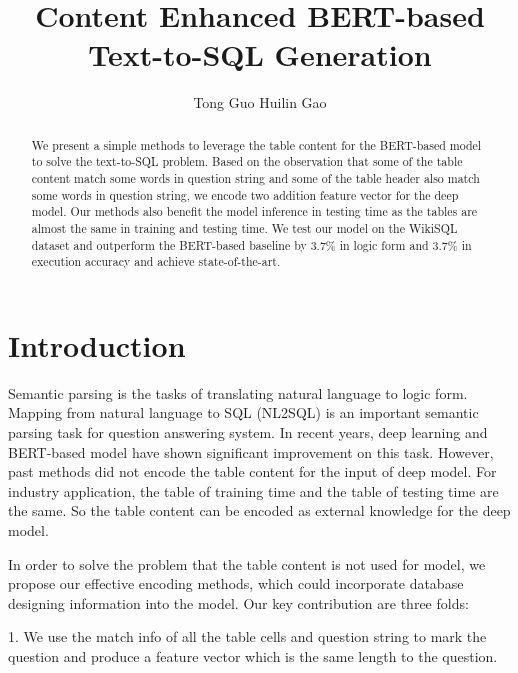 \documentclass{llncs}
\begin{document}
\title{Content Enhanced BERT-based \newline Text-to-SQL Generation}
\author{
Tong Guo
Huilin Gao
}


\maketitle              \begin{abstract}
We present a simple methods to leverage the table content for the BERT-based model to solve the text-to-SQL problem. Based on the observation that some of the table content match some words in question string and some of the table header also match some words in question string, we encode two addition feature vector for the deep model. Our methods also benefit the model inference in testing time as the tables are almost the same in training and testing time. We test our model on the WikiSQL dataset and outperform the BERT-based baseline by 3.7\% in logic form and 3.7\% in execution accuracy and  achieve state-of-the-art.

\end{abstract}
\section{Introduction}

Semantic parsing is the tasks of translating natural language to logic form. Mapping from natural language to SQL (NL2SQL) is an important semantic parsing
task for question answering system. In recent years, deep learning and BERT-based model have shown significant improvement on this task. However, past methods did not encode the table content for the input of deep model. For industry application, the table of training time and the table of testing time are the same. So the table content can be encoded as external knowledge for the deep model.

In order to solve the problem that the table content is not used for model, we propose our effective encoding methods, which could incorporate database designing information into the model. Our key contribution are three folds:

1. We use the match info of all the table cells and question string to mark the question and produce a feature vector which is the same length to the question. 
\end{document}
